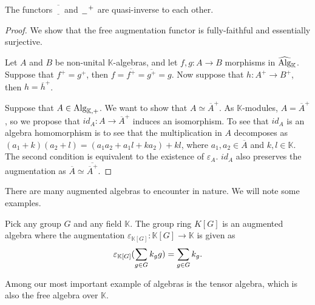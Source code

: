 \documentclass[../thesis.tex]{subfiles}
\begin{document}
            \begin{proposition}
                The functors $\overline{\underline{\phantom{A}}}$ and $\argument^+$ are quasi-inverse to each other.
            \end{proposition}

            \begin{proof}
                We show that the free augmentation functor is fully-faithful and essentially surjective. 

                Let $A$ and $B$ be non-unital $\mathbb{K}$-algebras, and let $f,g : A \rightarrow B$ morphisms in $\widehat{\tt{Alg}}_\mathbb{K}$. Suppose that $f^+ = g^+$, then $f = \overline{f^+} = \overline{g^+} = g$. Now suppose that $h : A^+ \rightarrow B^+$, then $h = \overline{h}^+$.

                Suppose that $A\in \tt{Alg}_{\mathbb{K},+}$. We want to show that $A \simeq \overline{A}^+$. As $\mathbb{K}$-modules, $A = \overline{A}^+$, so we propose that $id_A : A \rightarrow \overline{A}^+$ induces an isomorphism. To see that $id_A$ is an algebra homomorphism is to see that the multiplication in $A$ decomposes as $(a_1 + k)(a_2 + l) = (a_1a_2 + a_1l + ka_2) + kl$, where $a_1,a_2\in \overline{A}$ and $k,l \in \mathbb{K}$. The second condition is equivalent to the existence of $\varepsilon_A$. $id_A$ also preserves the augmentation as $\overline{A} \simeq \overline{\overline{A}^+}$.
            \end{proof}

            There are many augmented algebras to encounter in nature. We will note some examples.

            \begin{example}
                Pick any group $G$ and any field $\mathbb{K}$. The group ring $K[G]$ is an augmented algebra where the augmentation $\varepsilon_{\mathbb{K}[G]} : \mathbb{K}[G] \rightarrow \mathbb{K}$ is given as
                \begin{align*}
                    \varepsilon_{\mathbb{K}[G]}(\sum_{g\in G}k_gg) = \sum_{g\in G}k_g\tt{.}
                \end{align*}
            \end{example}

            Among our most important example of algebras is the tensor algebra, which is also the free algebra over $\mathbb{K}$.
\end{document}
